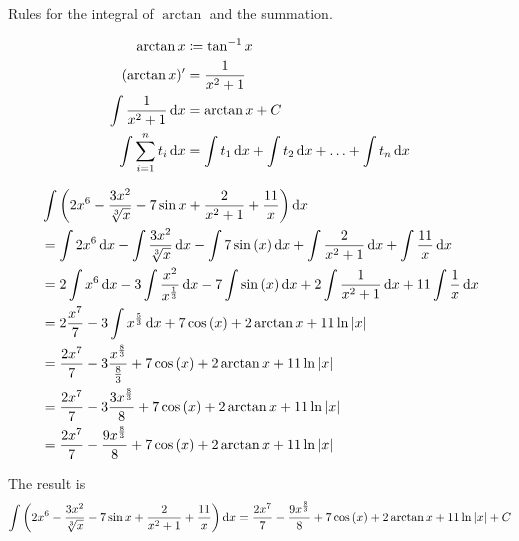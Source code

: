 Rules for the integral of $\arctan$ and the summation.

\begin{align*}
    \arctan{x} &\coloneq \tan^{-1}{x} \\
    (\arctan{x})' &= \frac{1}{x^{2} + 1} \\
    \int \frac{1}{x^{2} + 1} \mathop{}\!\mathrm{d}{x} &= \arctan{x} + C \\
    \int \sum_{i = 1}^{n} t_{i} \mathop{}\!\mathrm{d}{x} 
    &= \int t_{1} \mathop{}\!\mathrm{d}{x}
    + \int t_{2} \mathop{}\!\mathrm{d}{x}
    + \ldots 
    + \int t_{n} \mathop{}\!\mathrm{d}{x} \\
\end{align*}

\begin{align}
    &\int \left( 2x^{6} - \frac{3x^{2}}{\sqrt[3]{x}} 
    - 7\sin{x} + \frac{2}{x^{2} + 1} + \frac{11}{x} \right) \diff{x} \\
    &= \int 2x^{6} \diff{x} 
    - \int \frac{3x^{2}}{\sqrt[3]{x}} \diff{x}
    - \int 7\sin{(x)} \diff{x}
    + \int \frac{2}{x^{2} + 1} \diff{x}
    + \int \frac{11}{x} \diff{x} \\  
    &= 2\int x^{6} \diff{x} 
    - 3\int \frac{x^{2}}{x^{\frac{1}{3}}} \diff{x}
    - 7\int \sin{(x)} \diff{x}
    + 2\int \frac{1}{x^{2} + 1} \diff{x}
    + 11\int \frac{1}{x} \diff{x} \\
    &= 2 \frac{x^{7}}{7} 
    - 3\int x^{\frac{5}{3}} \diff{x}
    + 7\cos{(x)} 
    + 2\arctan{x}
    + 11\ln{|x|} \\
    &= \frac{2x^{7}}{7} 
    - 3\frac{x^{\frac{8}{3}}}{\frac{8}{3}}
    + 7\cos{(x)} 
    + 2\arctan{x}
    + 11\ln{|x|} \\
    &= \frac{2x^{7}}{7} 
    - 3\frac{3x^{\frac{8}{3}}}{8}
    + 7\cos{(x)} 
    + 2\arctan{x}
    + 11\ln{|x|} \\
    &= \frac{2x^{7}}{7} 
    - \frac{9x^{\frac{8}{3}}}{8}
    + 7\cos{(x)} 
    + 2\arctan{x}
    + 11\ln{|x|}
\end{align}

The result is
$$
    \int \left( 2x^{6} - \frac{3x^{2}}{\sqrt[3]{x}} 
    - 7\sin{x} + \frac{2}{x^{2} + 1} + \frac{11}{x} \right) \mathop{}\!\mathrm{d}{x}
    = \frac{2x^{7}}{7} 
    - \frac{9x^{\frac{8}{3}}}{8}
    + 7\cos{(x)} 
    + 2\arctan{x}
    + 11\ln{|x|} + C
$$

\pagebreak

